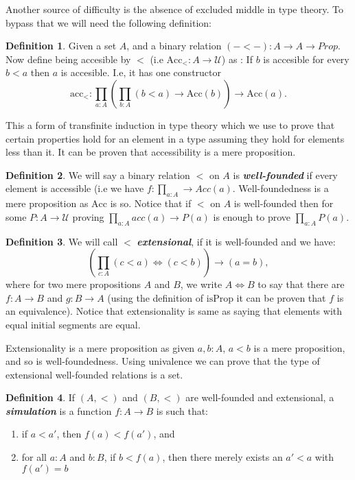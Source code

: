 \documentclass[10pt]{article}
\theoremstyle{definition}
\newtheorem{definition}{Definition}[section]
\theoremstyle{plain}
\theoremstyle{remark}
\newcommand{\U}{\mathscr{U}}
\begin{document}
Another source of difficulty is the absence of excluded middle in type theory. To bypass that
we will need the following definition:

\begin{definition}\label{D:Acc}
Given a set $A$, and a binary relation $(-<-) : A \to A \to Prop$. Now define being 
accesible by $<$ (i.e $\text{Acc}_{<} : A \to \U$) as : If $b$ is accesible for every $b<a$ 
then $a$ is accesible. I.e, it has one constructor 
\[ \text{acc}_< : \prod_{a : A} \left( \prod_{b : A} (b<a) \to \text{Acc}(b) \right) 
\to \text{Acc}(a). \]

\end{definition}
 
This a form of transfinite induction in type theory which we use to prove that certain
properties hold for an element in a type assuming they hold for elements less than it.
It can be proven that accessibility is a mere proposition. 

\begin{definition}\label{D:WF}
We will say a binary relation $<$ on $A$ is \textbf{\textit{well-founded}} if every element
is accessible (i.e we have $f : \prod_{a : A} \to Acc(a)$. Well-foundedness is a mere 
proposition as $\text{Acc}$ is so. Notice that if $<$ on $A$ is well-founded then for some 
$P : A \to \U$ proving $\prod_{a:A} acc(a) \to P(a)$ is enough to prove $\prod_{a : A} P(a)$.
\end{definition}

\begin{definition}\label{D:Ext}
We will call $<$ \textbf{\textit{extensional}}, if it is well-founded and we have:
\[ \left( \prod_{c : A}  (c<a) \iff (c<b) \right) \to (a = b),\]
where for two mere propositions $A$ and $B$, we write $A\iff B$ to say that there are 
$f : A \to B$ and $g : B \to A$ (using the definition of $\text{isProp}$ it can be proven 
that $f$ is an equivalence). Notice that extensionality is same as saying that elements 
with equal initial segments are equal.
\end{definition} 

Extensionality is a mere proposition as given $a,b:A$, $a<b$ is a mere proposition, and so
is well-foundedness. Using univalence we can prove that the type of extensional well-founded
relations is a set.

\begin{definition}\label{D:sim}
If $(A,<)$ and $(B,<)$ are well-founded and extensional, a \textbf{\textit{simulation}} is
a function $f : A \to B$ is such that:
\begin{enumerate}
\item if $a < a'$, then $f(a) < f(a')$, and
\item for all $a : A$ and $b : B$, if $b < f(a)$, then there merely exists an $a' < a$ with
      $f(a') = b$
\end{enumerate}
\end{definition} 
\end{document}
